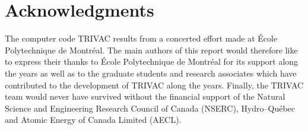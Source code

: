 \section*{Acknowledgments}

The computer code TRIVAC results from a concerted effort made at \'{E}cole Polytechnique de
Montr\'{e}al. The main authors of this  report would therefore like to express their thanks to
\'{E}cole Polytechnique de Montr\'{e}al for its support along the years as well as to
the graduate students and research associates which have contributed to the development of
TRIVAC along the years. Finally, the TRIVAC  team would never have survived without  the financial
support of the  Natural Science and Engineering Research Council of Canada (NSERC),
Hydro--Qu\'{e}bec and Atomic Energy of Canada Limited (AECL). 
